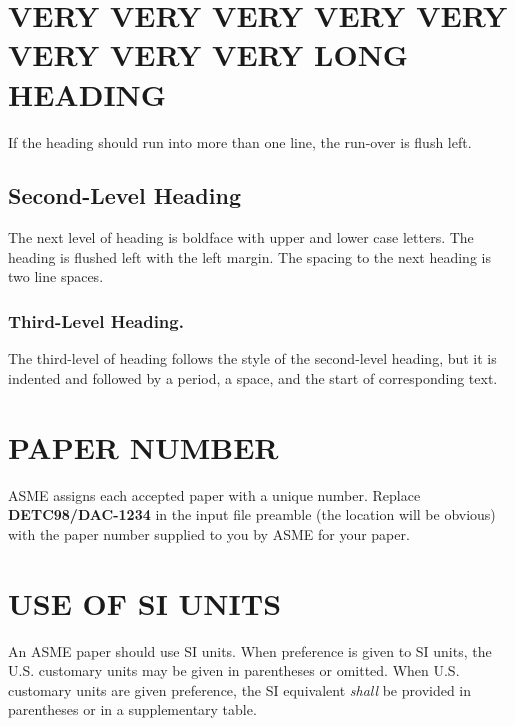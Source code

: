 \documentclass[twocolumn,10pt]{asme2e}
\begin{document}
\section*{VERY VERY VERY VERY VERY VERY VERY VERY LONG HEADING}

If the heading should run into more than one line, the run-over is flush left.

\subsection*{Second-Level Heading}

The next level of heading is boldface with upper and lower case letters. The heading is flushed left with the left margin. The spacing to the next heading is two line spaces.

\subsubsection*{Third-Level Heading.}

The third-level of heading follows the style of the second-level heading, but it is indented and followed by a period, a space, and the start of corresponding text.

\section*{PAPER NUMBER}

ASME assigns each accepted paper with a unique number. Replace {\bf DETC98/DAC-1234} in the input file preamble (the location will be obvious) with the paper number supplied to you  by ASME for your paper.


\section*{USE OF SI UNITS}

An ASME paper should use SI units.  When preference is given to SI units, the U.S. customary units may be given in parentheses or omitted. When U.S. customary units are given preference, the SI equivalent {\em shall} be provided in parentheses or in a supplementary table. 
\end{document}
